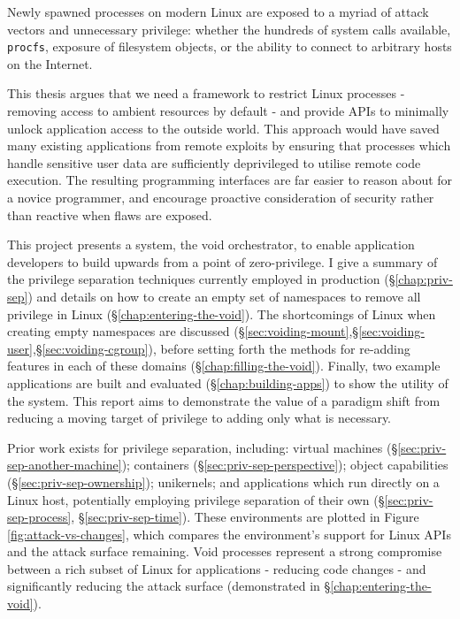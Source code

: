 \documentclass[12pt,a4paper,twoside]{report}
\begin{document}
Newly spawned processes on modern Linux are exposed to a myriad of attack vectors and unnecessary privilege: whether the hundreds of system calls available, \texttt{procfs}, exposure of filesystem objects, or the ability to connect to arbitrary hosts on the Internet.

This thesis argues that we need a framework to restrict Linux processes - removing access to ambient resources by default - and provide APIs to minimally unlock application access to the outside world. This approach would have saved many existing applications from remote exploits by ensuring that processes which handle sensitive user data are sufficiently deprivileged to utilise remote code execution. The resulting programming interfaces are far easier to reason about for a novice programmer, and encourage proactive consideration of security rather than reactive when flaws are exposed.

This project presents a system, the void orchestrator, to enable application developers to build upwards from a point of zero-privilege. I give a summary of the privilege separation techniques currently employed in production (§\ref{chap:priv-sep}) and details on how to create an empty set of namespaces to remove all privilege in Linux (§\ref{chap:entering-the-void}). The shortcomings of Linux when creating empty namespaces are discussed (§\ref{sec:voiding-mount},§\ref{sec:voiding-user},§\ref{sec:voiding-cgroup}), before setting forth the methods for re-adding features in each of these domains (§\ref{chap:filling-the-void}). Finally, two example applications are built and evaluated (§\ref{chap:building-apps}) to show the utility of the system. This report aims to demonstrate the value of a paradigm shift from reducing a moving target of privilege to adding only what is necessary.

Prior work exists for privilege separation, including: virtual machines (§\ref{sec:priv-sep-another-machine}); containers (§\ref{sec:priv-sep-perspective}); object capabilities (§\ref{sec:priv-sep-ownership}); unikernels; and applications which run directly on a Linux host, potentially employing privilege separation of their own (§\ref{sec:priv-sep-process}, §\ref{sec:priv-sep-time}). These environments are plotted in Figure \ref{fig:attack-vs-changes}, which compares the environment's support for Linux APIs and the attack surface remaining. Void processes represent a strong compromise between a rich subset of Linux for applications - reducing code changes - and significantly reducing the attack surface (demonstrated in §\ref{chap:entering-the-void}).
\end{document}
